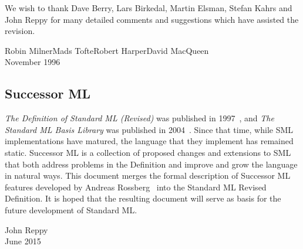 

We wish to thank Dave Berry, Lars Birkedal, Martin Elsman, Stefan Kahrs
and John Reppy for many detailed comments and suggestions which have assisted
the revision.

\begin{flushright}
Robin Milner\quad Mads Tofte\quad Robert Harper\quad David MacQueen\\[1cm]
November 1996
\end{flushright}

{}

\subsection*{Successor ML}
{\it The Definition of Standard ML (Revised)} was published in 1997~\cite{sml97-definition}, and
{\it The Standard ML Basis Library} was published in 2004~\cite{sml-basis-lib}.
Since that time, while SML implementations have matured, the language that they
implement has remained static.
Successor ML is a collection of proposed changes and extensions to SML that both
address problems in the Definition and improve and grow the language in natural ways.
This document merges the formal description of Successor ML features developed
by Andreas Rossberg~\cite{hamlet-s} into the Standard ML Revised Definition.
It is hoped that the resulting document will serve as basis for the future development
of Standard ML.

\begin{flushright}
John Reppy\\[1cm]
June 2015
\end{flushright}

